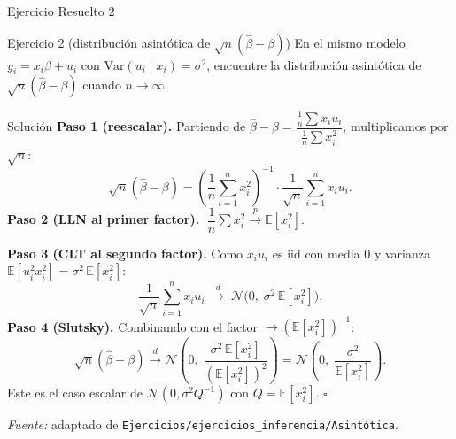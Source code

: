 \documentclass{beamer}
\begin{document}
\begin{frame}[allowframebreaks]{Ejercicio Resuelto 2}

\begin{block}{Ejercicio 2 (distribución asintótica de $\sqrt{n}(\hat{\beta}-\beta)$)}
En el mismo modelo $y_i=x_i\beta+u_i$ con $\text{Var}(u_i\mid x_i)=\sigma^2$, encuentre la distribución asintótica de $\sqrt{n}(\hat{\beta}-\beta)$ cuando $n\to\infty$.
\end{block}

\pause

\begin{exampleblock}{Solución}
\textbf{Paso 1 (reescalar).} Partiendo de $\hat{\beta}-\beta = \dfrac{\frac{1}{n}\sum x_i u_i}{\frac{1}{n}\sum x_i^2}$, multiplicamos por $\sqrt{n}$:
\[
\sqrt{n}(\hat{\beta}-\beta) = \left(\frac{1}{n}\sum_{i=1}^n x_i^2\right)^{-1}\cdot \frac{1}{\sqrt{n}}\sum_{i=1}^n x_i u_i.
\]
\textbf{Paso 2 (LLN al primer factor).} $\;\dfrac{1}{n}\sum x_i^2 \overset{p}{\to}\mathbb{E}[x_i^2]$.

\framebreak

\textbf{Paso 3 (CLT al segundo factor).} Como $x_i u_i$ es iid con media $0$ y varianza $\mathbb{E}[u_i^2 x_i^2]=\sigma^2\,\mathbb{E}[x_i^2]$:
\[
\frac{1}{\sqrt{n}}\sum_{i=1}^n x_i u_i \;\overset{d}{\to}\; \mathcal{N}\big(0,\;\sigma^2\,\mathbb{E}[x_i^2]\big).
\]
\textbf{Paso 4 (Slutsky).} Combinando con el factor $\to (\mathbb{E}[x_i^2])^{-1}$:
\[
\sqrt{n}(\hat{\beta}-\beta) \overset{d}{\to} \mathcal{N}\!\left(0,\; \frac{\sigma^2\,\mathbb{E}[x_i^2]}{(\mathbb{E}[x_i^2])^2}\right) = \mathcal{N}\!\left(0,\; \frac{\sigma^2}{\mathbb{E}[x_i^2]}\right).
\]
Este es el caso escalar de $\mathcal{N}(0,\sigma^2 Q^{-1})$ con $Q=\mathbb{E}[x_i^2]$. \hfill $\square$

\vspace{2pt}
{\small \textit{Fuente:} adaptado de \texttt{Ejercicios/ejercicios\_inferencia/Asintótica}.}
\end{exampleblock}

\end{frame}
\end{document}
